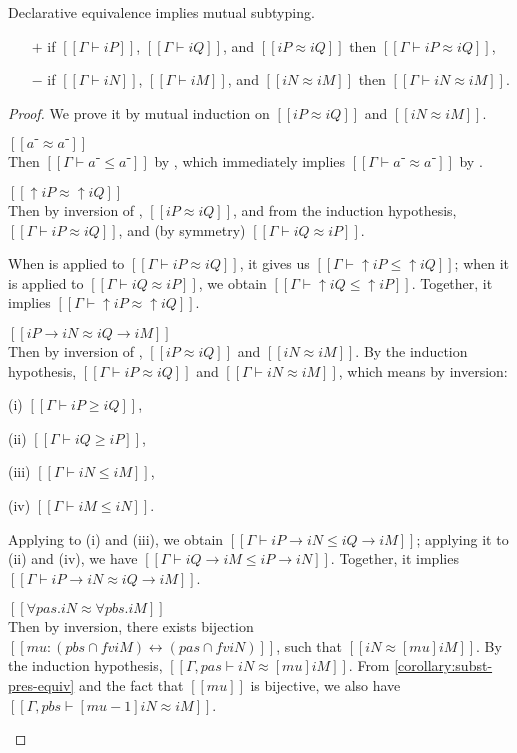 \begin{lemma}
  \label{lemma:equiv-soundness}
  Declarative equivalence implies mutual subtyping.
  \begin{itemize}
    \item[$+$] if $[[Γ ⊢ iP]]$, $[[Γ ⊢ iQ]]$, and $[[iP ≈ iQ]]$ then $[[Γ ⊢ iP ≈ iQ]]$,
    \item[$-$] if $[[Γ ⊢ iN]]$, $[[Γ ⊢ iM]]$, and $[[iN ≈ iM]]$ then $[[Γ ⊢ iN ≈ iM]]$.
  \end{itemize}
\end{lemma}
\begin{proof}
  We prove it by mutual induction on $[[iP ≈ iQ]]$ and $[[iN ≈ iM]]$.
  \begin{caseof}
    \item $[[a⁻ ≈ a⁻]]$\\
      Then $[[Γ ⊢ a⁻ ≤ a⁻]]$ by ,
      which immediately implies $[[Γ ⊢ a⁻ ≈ a⁻]]$ by .

    \item $[[↑iP ≈ ↑iQ]]$\\
      Then by inversion of ,
      $[[iP ≈ iQ]]$, and from the induction hypothesis, $[[Γ ⊢ iP ≈ iQ]]$,
      and (by symmetry) $[[Γ ⊢ iQ ≈ iP]]$.

      When  is applied to $[[Γ ⊢ iP ≈ iQ]]$,
      it gives us $[[Γ ⊢ ↑iP ≤ ↑iQ]]$; when it is applied to $[[Γ ⊢ iQ ≈ iP]]$,
      we obtain $[[Γ ⊢ ↑iQ ≤ ↑iP]]$. Together, it implies $[[Γ ⊢ ↑iP ≈ ↑iQ]]$.

    \item $[[iP → iN ≈ iQ → iM]]$\\
      Then by inversion of ,
      $[[iP ≈ iQ]]$ and $[[iN ≈ iM]]$. By the induction hypothesis,
      $[[Γ ⊢ iP ≈ iQ]]$ and $[[Γ ⊢ iN ≈ iM]]$, which means by inversion:
      \begin{enumerate*}
        \item[(i)] $[[Γ ⊢ iP ≥ iQ]]$,
        \item[(ii)] $[[Γ ⊢ iQ ≥ iP]]$,
        \item[(iii)] $[[Γ ⊢ iN ≤ iM]]$,
        \item[(iv)]  $[[Γ ⊢ iM ≤ iN]]$.
      \end{enumerate*}
      Applying  to (i) and (iii), we obtain
      $[[Γ ⊢ iP → iN ≤ iQ → iM]]$; applying it to (ii) and (iv), we have $[[Γ ⊢
      iQ → iM ≤ iP → iN]]$. Together, it implies $[[Γ ⊢ iP → iN ≈ iQ → iM]]$.
    \item $[[∀pas.iN ≈ ∀pbs.iM]]$\\
      Then by inversion, there exists bijection $[[mu : ({pbs} ∩ fv iM) ↔ ({pas}
      ∩ fv iN)]]$, such that $[[iN ≈ [mu] iM]]$. By the induction hypothesis,
      $[[Γ, pas ⊢ iN ≈ [mu] iM]]$. From \cref{corollary:subst-pres-equiv} and
      the fact that $[[mu]]$ is bijective, we also have
      $[[Γ, pbs ⊢ [mu-1]iN ≈ iM]]$.


\end{caseof}
\end{proof}
